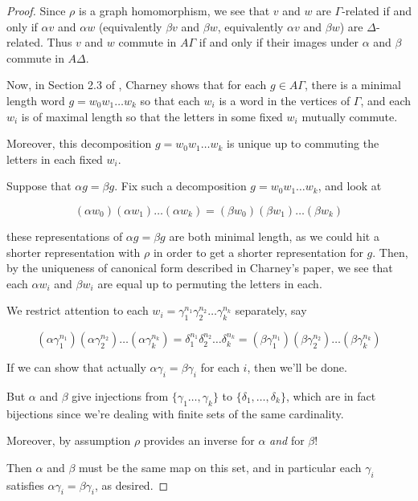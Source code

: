 \documentclass[12pt]{article}
\theoremstyle{definition}
\theoremstyle{theorem}
\begin{document}
\begin{proof}
    Since $\rho$ is a graph
    homomorphism, we see that $v$ and $w$ are $\Gamma$-related if and only if $\alpha v$
    and $\alpha w$ (equivalently $\beta v$ and $\beta w$, equivalently $\alpha v$ and $\beta w$) 
    are $\Delta$-related. Thus $v$ and $w$ commute in $A \Gamma$ if and only 
    if their images under $\alpha$ and $\beta$ commute in $A \Delta$.

    Now, in Section 2.3 of \cite{charneyIntroductionRightangledArtin2007},
    Charney shows that for each $g \in A\Gamma$,
    there is a minimal length word $g = w_0 w_1 \ldots w_k$ so that each 
    $w_i$ is a word in the vertices of $\Gamma$, and each $w_i$ is of maximal 
    length so that the letters in some fixed $w_i$ mutually commute.

    Moreover, this decomposition $g = w_0 w_1 \ldots w_k$ is unique up to 
    commuting the letters in each fixed $w_i$.

    Suppose that $\alpha g = \beta g$. Fix such a decomposition
    $g = w_0 w_1 \ldots w_k$, and look at 

    \[ (\alpha w_0) (\alpha w_1) \ldots (\alpha w_k) = (\beta w_0) (\beta w_1) \ldots (\beta w_k) \]

    these representations of $\alpha g = \beta g$ are both minimal length, as 
    we could hit a shorter representation with $\rho$ in order to get a 
    shorter representation for $g$. Then, by the uniqueness of canonical form 
    described in Charney's paper, 
    we see that each $\alpha w_i$ and $\beta w_i$ are equal up to permuting the 
    letters in each. 
    
    We restrict attention to each 
    $w_i = \gamma_1^{n_1} \gamma_2^{n_2} \ldots \gamma_k^{n_k}$ separately, say

    \[ 
    (\alpha \gamma_1^{n_1}) (\alpha \gamma_2^{n_2}) \ldots (\alpha \gamma_k^{n_k}) = 
    \delta_1^{n_1} \delta_2^{n_2} \ldots \delta_k^{n_k} =
    (\beta \gamma_1^{n_1}) (\beta \gamma_2^{n_2}) \ldots (\beta \gamma_k^{n_k})
    \]

    If we can show that actually $\alpha \gamma_i = \beta \gamma_i$ for each $i$,
    then we'll be done.

    But $\alpha$ and $\beta$ give injections from $\{ \gamma_1 \ldots, \gamma_k \}$
    to $\{ \delta_1, \ldots, \delta_k \}$, which are in fact bijections since we're
    dealing with finite sets of the same cardinality. 

    Moreover, by assumption $\rho$ provides an inverse for $\alpha$ \emph{and} 
    for $\beta$!

    Then $\alpha$ and $\beta$ must be the same map on this set, and in particular
    each $\gamma_i$ satisfies $\alpha \gamma_i = \beta \gamma_i$, as desired.
\end{proof}
\end{document}
